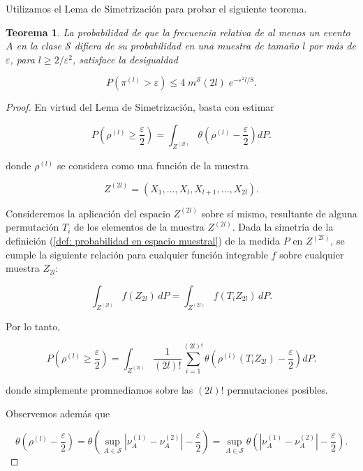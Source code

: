 \documentclass{report}
\newtheorem{thm}{Teorema}[section]
\begin{document}
Utilizamos el Lema de Simetrización para probar el siguiente teorema.\newline

\begin{thm}
    La probabilidad de que la frecuencia relativa de al menos un evento $A$ en la clase \( \mathcal{S} \) difiera de su probabilidad en una 
    muestra de tamaño \( l \) por más de \( \varepsilon \), para \( l \geq 2 / \varepsilon^2 \), satisface la desigualdad  

    \[
    P\left(\pi^{(l)} > \varepsilon\right) \leq 4 \; m^{\mathcal{S}}(2l) \; e^{-\varepsilon^2 l/8}.
    \]  
\end{thm}

\begin{proof}
 
En virtud del Lema de Simetrización, basta con estimar  
    
\[
P\left( \rho^{(l)} \geq \frac{\varepsilon}{2} \right) = \int_{Z^{(2l)}} \theta \left( \rho^{(l)} - \frac{\varepsilon}{2} \right) dP.
\]

donde \( \rho^{(l)} \) se considera como una función de la muestra  

\[
Z^{(2l)} = (X_1, \dots, X_l, X_{l+1}, \dots, X_{2l}).
\]

Consideremos la aplicación del espacio \( Z^{(2l)} \) sobre sí mismo, resultante de alguna permutación \( T_i \) de los elementos de la muestra \( Z^{(2l)} \). Dada la simetría 
de la definición (\ref{def: probabilidad en espacio muestral}) de la medida \( P \) en \( Z^{(2l)} \), se cumple la siguiente relación para cualquier función integrable \( f \)
sobre cualquier muestra $Z_{2l}$:

\[
\int_{Z^{(2l)}} f(Z_{2l}) \, dP = \int_{Z^{(2l)}} f(T_i Z_{2l}) \, dP.
\]

Por lo tanto,

\begin{equation}\label{eq:probabilidad integral con permutaciones}
P\left( \rho^{(l)} \geq \frac{\varepsilon}{2} \right) = \int_{Z^{(2l)}} \frac{1}{(2l)!} \sum_{i=1}^{(2l)!} \theta \left( \rho^{(l)}(T_i Z_{2l}) - \frac{\varepsilon}{2}  \right) dP.
\end{equation}

donde simplemente promnediamos sobre las \((2l)!\) permutaciones posibles.\newline

Observemos además que

\[
\theta \left( \rho^{(l)} - \frac{\varepsilon}{2} \right) = \theta \left( \sup_{A \in \mathcal{S}} \left| \nu^{(1)}_A - \nu^{(2)}_A \right| -
 \frac{\varepsilon}{2} \right) = \sup_{A \in \mathcal{S}} \theta \left( \left| \nu^{(1)}_A - \nu^{(2)}_A \right| - \frac{\varepsilon}{2} \right).
\]


\end{proof}
\end{document}
